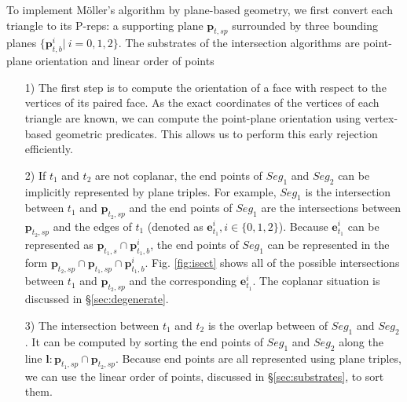 To implement M\"{o}ller's algorithm by plane-based geometry, we first convert each triangle to its P-reps: a supporting plane $\bm{p}_{t, sp}$  surrounded by three bounding planes $\{\bm{p}_{t, b}^i|\ i = 0,1,2\}$. The substrates of the intersection algorithms are point-plane orientation and linear order of points
\begin{itemize}[leftmargin=0.45cm]
  \item[1)] The first step is to compute the orientation of a face with respect to the vertices of its paired face. As the exact coordinates of the vertices of each triangle are known, we can compute the point-plane orientation using vertex-based geometric predicates. This allows us to perform this early rejection efficiently.
      \vspace{0.5em}
  \item[2)] If $t_1$ and $t_2$ are not coplanar, the end points of $Seg_1$ and $Seg_2$ can be implicitly represented by plane triples. For example, $Seg_1$ is the intersection between $t_1$ and $\bm{p}_{t_2, sp}$ and the end points of $Seg_1$ are the intersections between $\bm{p}_{t_2, sp}$ and the edges of $t_1$ (denoted as $\bm{e}^i_{t_1}, i\in\{0,1,2\}$). Because $\bm{e}^i_{t_1}$ can be represented as $\bm{p}_{t_1, s}\cap \bm{p}^i_{t_1, b}$, the end points of $Seg_1$ can be represented in the form $\bm{p}_{t_2, sp} \cap \bm{p}_{t_1, sp} \cap \bm{p}^i_{t_1, b}$. Fig. \ref{fig:isect} shows all of the possible intersections between $t_1$ and $\bm{p}_{t_2, sp}$ and the corresponding $\bm{e}^i_{t_1}$. The coplanar situation is discussed in \S \ref{sec:degenerate}.
      \vspace{0.5em}
 \item[3)] The intersection between $t_1$ and $t_2$ is the overlap between of $Seg_1$ and $Seg_2$. It can be computed by sorting the end points of $Seg_1$ and $Seg_2$ along the line $\bm{l}\colon \bm{p}_{t_1, sp} \cap \bm{p}_{t_2, sp}$. Because end points are all represented using plane triples, we can use the linear order of points, discussed in \S \ref{sec:substrates}, to sort them.

\end{itemize}

